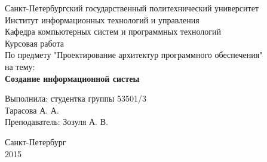 \thispagestyle{empty}
\begin{center}
\large Санкт-Петербургский государственный политехнический университет\\
Институт информационных технологий и управления\\
Кафедра компьютерных систем и программных технологий\\
\vspace{60mm}
\Large Курсовая работа \\ По предмету "Проектирование архитектур программного обеспечения" \\на тему:\\
\LARGE\textbf{Создание информационной систеы}
\end{center}

\vspace{35mm}
\begin{flushright}
\large Выполнила: студентка группы 53501/3\\ Тарасова А. А.\\ Преподаватель: Зозуля А. В.
\end{flushright}
\vspace{30mm}

\begin{center}
Санкт-Петербург\\ 2015
\end{center}